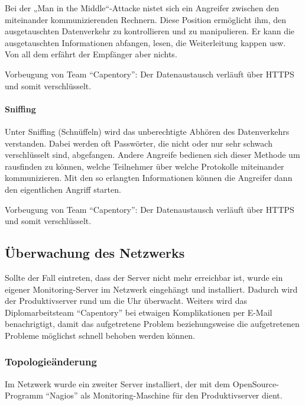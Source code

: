 Bei der „Man in the Middle``-Attacke nistet sich ein Angreifer zwischen
den miteinander kommunizierenden Rechnern. Diese Position ermöglicht
ihm, den ausgetauschten Datenverkehr zu kontrollieren und zu
manipulieren. Er kann \zB die ausgetauschten Informationen abfangen,
lesen, die Weiterleitung kappen usw. Von all dem erfährt der Empfänger
aber nichts.

Vorbeugung von Team ``Capentory'': Der Datenaustausch verläuft über
HTTPS und somit verschlüsselt.

\hypertarget{sniffing}{%
\paragraph{Sniffing}\label{sniffing}}

Unter Sniffing (Schnüffeln) wird das unberechtigte Abhören des
Datenverkehrs verstanden. Dabei werden oft Passwörter, die nicht oder
nur sehr schwach verschlüsselt sind, abgefangen. Andere Angreife
bedienen sich dieser Methode um rausfinden zu können, welche Teilnehmer
über welche Protokolle miteinander kommunizieren. Mit den so erlangten
Informationen können die Angreifer dann den eigentlichen Angriff
starten.

Vorbeugung von Team ``Capentory'': Der Datenaustausch verläuft über
HTTPS und somit verschlüsselt.

\hypertarget{uxfcberwachung-des-netzwerks}{%
\subsection{Überwachung des
Netzwerks}\label{uxfcberwachung-des-netzwerks}}

Sollte der Fall eintreten, dass der Server nicht mehr erreichbar ist,
wurde ein eigener Monitoring-Server im Netzwerk eingehängt und
installiert. Dadurch wird der Produktivserver rund um die Uhr überwacht.
Weiters wird das Diplomarbeitsteam ``Capentory'' bei etwaigen
Komplikationen per E-Mail benachrigtigt, damit das aufgetretene Problem
beziehungsweise die aufgetretenen Probleme möglichst schnell behoben
werden können.

\hypertarget{topologieuxe4nderung}{%
\subsubsection{Topologieänderung}\label{topologieuxe4nderung}}

Im Netzwerk wurde ein zweiter Server installiert, der mit dem
OpenSource-Programm ``Nagios'' als Monitoring-Maschine für den
Produktivserver dient.

